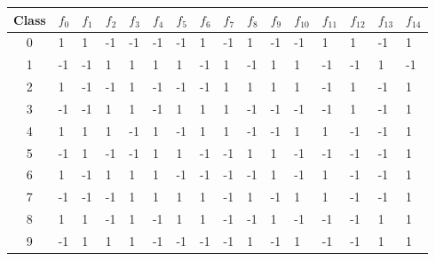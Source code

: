 \begin{tabular}{|c|l|l|l|l|l|l|l|l|l|l|l|l|l|l|l|}
	\hline
	Class	& $f_0$ & $f_1$ & $f_2$ & $f_3$ & $f_4$ & $f_5$ & $f_6$ & $f_7$ & $f_8$ & $f_9$ & $f_{10}$ & $f_{11}$ & $f_{12}$ & $f_{13}$ & $f_{14}$ \\ \hline \hline
	0	& 1 & 1 & -1 & -1 & -1 & -1 & 1 & -1 & 1 & -1 & -1 & 1 & 1 & -1 & 1 \\ \hline
	1	& -1 & -1 & 1 & 1 & 1 & 1 & -1 & 1 & -1 & 1 & 1 & -1 & -1 & 1 & -1 \\ \hline
	2	& 1 & -1 & -1 & 1 & -1 & -1 & -1 & 1 & 1 & 1 & 1 & -1 & 1 & -1 & 1 \\ \hline
	3	& -1 & -1 & 1 & 1 & -1 & 1 & 1 & 1 & -1 & -1 & -1 & -1 & 1 & -1 & 1 \\ \hline
	4	& 1 & 1 & 1 & -1 & 1 & -1 & 1 & 1 & -1 & -1 & 1 & 1 & -1 & -1 & 1 \\ \hline
	5	& -1 & 1 & -1 & -1 & 1 & 1 & -1 & -1 & 1 & 1 & -1 & -1 & -1 & -1 & 1 \\ \hline
	6	& 1 & -1 & 1 & 1 & 1 & -1 & -1 & -1 & -1 & 1 & -1 & 1 & -1 & -1 & 1 \\ \hline
	7	& -1 & -1 & -1 & 1 & 1 & 1 & 1 & -1 & 1 & -1 & 1 & 1 & -1 & -1 & 1 \\ \hline
	8	& 1 & 1 & -1 & 1 & -1 & 1 & 1 & -1 & -1 & 1 & -1 & -1 & -1 & 1 & 1 \\ \hline
	9	& -1 & 1 & 1 & 1 & -1 & -1 & -1 & -1 & 1 & -1 & 1 & -1 & -1 & 1 & 1 \\ \hline
\end{tabular}